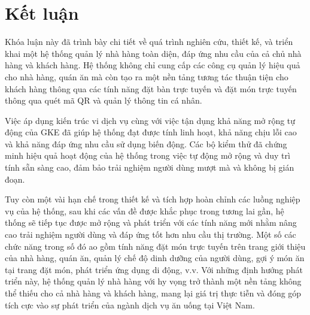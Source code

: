 \chapter*{Kết luận}\label{chap5}
Khóa luận này đã trình bày chi tiết về quá trình nghiên cứu, thiết kế, và triển khai một hệ thống quản lý nhà hàng toàn diện, đáp ứng nhu cầu của cả chủ nhà hàng và khách hàng.
Hệ thống không chỉ cung cấp các công cụ quản lý hiệu quả cho nhà hàng, quán ăn mà còn tạo ra một nền tảng tương tác thuận tiện cho khách hàng thông qua các tính năng đặt bàn trực tuyến và đặt món trực tuyến thông qua quét mã QR và quản lý thông tin cá nhân.

Việc áp dụng kiến trúc vi dịch vụ cùng với việc tận dụng khả năng mở rộng tự động của GKE đã giúp hệ thống đạt được tính linh hoạt, khả năng chịu lỗi cao và khả năng đáp ứng nhu cầu sử dụng biến động. Các bộ kiểm thử đã chứng minh hiệu quả hoạt động của hệ thống trong việc tự động mở rộng và duy trì tính sẵn sàng cao, đảm bảo trải nghiệm người dùng mượt mà và không bị gián đoạn.

Tuy còn một vài hạn chế trong thiết kế và tích hợp hoàn chỉnh các luồng nghiệp vụ của hệ thống, sau khi các vấn đề được khắc phục trong tương lai gần, hệ thống sẽ tiếp tục được mở rộng và phát triển với các tính năng mới nhằm nâng cao trải nghiệm người dùng và đáp ứng tốt hơn nhu cầu thị trường.
Một số các chức năng trong số đó ao gồm tính năng đặt món trực tuyến trên trang giới thiệu của nhà hàng, quán ăn, quản lý chế độ dinh dưỡng của người dùng, gợi ý món ăn tại trang đặt món, phát triển ứng dụng di động, v.v.
Với những định hướng phát triển này, hệ thống quản lý nhà hàng với hy vọng trở thành một nền tảng không thể thiếu cho cả nhà hàng và khách hàng, mang lại giá trị thực tiễn và đóng góp tích cực vào sự phát triển của ngành dịch vụ ăn uống tại Việt Nam.